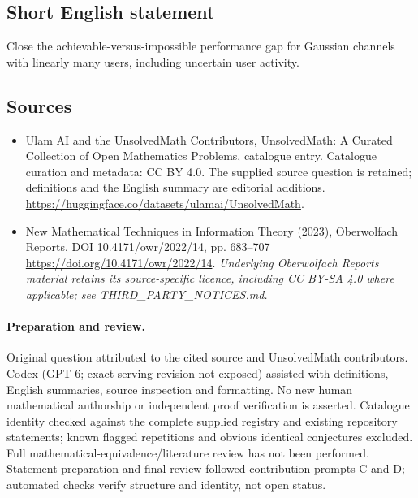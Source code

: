 \documentclass[11pt]{article}
\begin{document}
\subsection{Short English statement}
Close the achievable-versus-impossible performance gap for Gaussian channels with linearly many users, including uncertain user activity.
\subsection{Sources}
\begin{itemize}
\item[\hypertarget{source:statement:1}{S1}] Ulam AI and the UnsolvedMath Contributors, UnsolvedMath: A Curated Collection of Open Mathematics Problems, catalogue entry. Catalogue curation and metadata: CC BY 4.0. The supplied source question is retained; definitions and the English summary are editorial additions.
\url{https://huggingface.co/datasets/ulamai/UnsolvedMath}.
\item[\hypertarget{source:statement:2}{S2}] New Mathematical Techniques in Information Theory (2023), Oberwolfach Reports, DOI 10.4171/owr/2022/14, pp. 683--707
\url{https://doi.org/10.4171/owr/2022/14}.
\textit{Underlying Oberwolfach Reports material retains its source-specific licence, including CC BY-SA 4.0 where applicable; see THIRD\_PARTY\_NOTICES.md.}
\end{itemize}
\paragraph{Preparation and review.}
Original question attributed to the cited source and UnsolvedMath contributors. Codex (GPT-6; exact serving revision not exposed) assisted with definitions, English summaries, source inspection and formatting. No new human mathematical authorship or independent proof verification is asserted. Catalogue identity checked against the complete supplied registry and existing repository statements; known flagged repetitions and obvious identical conjectures excluded. Full mathematical-equivalence/literature review has not been performed. Statement preparation and final review followed contribution prompts C and D; automated checks verify structure and identity, not open status.
\label{end:statement}
\end{document}
